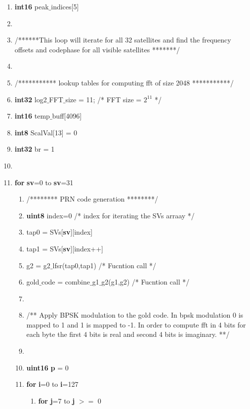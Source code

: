 \documentclass[journal,10pt,onecolumn]{article}
\begin{document}
\begin{itemize}
\begin{enumerate}
    \item[] \textbf{int16} peak$\_$indices[5]
    \item[]
    \item[] /******This loop will iterate for all 32 satellites and find the frequency offsets and codephase for all visible satellites *******/
    \item[] 
    \item[] /*********** lookup tables for computing fft of size 2048 ***********/
    \item[] \textbf{int32} log2$\_$FFT$\_$size = 11;  \hspace{5mm} /* FFT size = $2^{11}$ */  
    \item[] \textbf{int16} temp$\_$buff[4096]
    \item[] \textbf{int8}  ScalVal[13] = {0}
    \item[] \textbf{int32} br = 1
    \item[] 
    \item[] \textbf{for} \textbf{sv}=0 to \textbf{sv}=31
	\begin{enumerate}
        \item[] /******** PRN code generation ********/
        \item[] \textbf{uint8} index=0    \hspace{5mm} /* index for iterating the SVs arraay */ 
        \item[] tap0 = SVs[\textbf{sv}][index]
        \item[] tap1 = SVs[\textbf{sv}][index++]
        \item[] g2 = g2$\_$lfsr(tap0,tap1)   /* Fucntion call */
        \item[] gold$\_$code = combine$\_$g1$\_$g2(g1,g2)  /* Fucntion call */
        \item[]
        \item[]  /** Apply BPSK modulation to the gold code. In bpsk modulation 0 is mapped to 1 and 1 is mapped to -1. In order to compute fft in 4 bits for each byte the first 4 bits is real and second 4 bits is imaginary. **/
        \item[]
        \item[] \textbf{uint16} \textbf{p} = 0
        \item[] \textbf{for} \textbf{i}=0 to \textbf{i}=127
        \begin{enumerate}
            \item[] \textbf{for} \textbf{j}=7 to \textbf{j} $>=$ 0
            \begin{enumerate}

\end{enumerate}
\end{enumerate}
\end{enumerate}
\end{enumerate}
\end{itemize}
\end{document}
